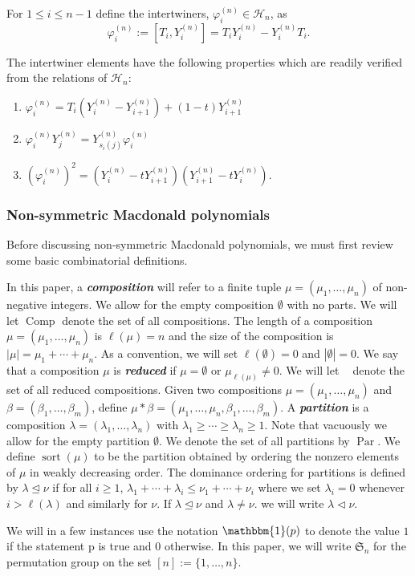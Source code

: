 \documentclass[ALCO,Unicode]{cedram}
\DeclareMathOperator{\sort}{sort}
\DeclareMathOperator{\Par}{\mathrm{Par}}
\DeclareMathOperator{\Comp}{\mathrm{Comp}}
\DeclareMathOperator{\Compred}{\mathrm{Comp}^{\textit{red}}}
\begin{document}
\begin{defi}
    For $1\leq i \leq n-1$ define the intertwiners, $\varphi_i^{(n)} \in \mathscr{H}_n$, as 
    $$\varphi_i^{(n)}:= [T_i,Y_i^{(n)}] = T_iY_i^{(n)} - Y_i^{(n)}T_i.$$
\end{defi}

The intertwiner elements have the following properties which are readily verified from the relations of $\mathscr{H}_{n}$: 
\begin{enumerate}
    \item $\varphi_i^{(n)} = T_i(Y_i^{(n)}-Y_{i+1}^{(n)}) + (1-t)Y_{i+1}^{(n)}$
    \item $\varphi_i^{(n)}Y_j^{(n)} = Y_{s_{i}(j)}^{(n)}\varphi_i^{(n)}$
    \item $(\varphi_i^{(n)})^2 = (Y_i^{(n)}-tY_{i+1}^{(n)})(Y_{i+1}^{(n)}-tY_i^{(n)}).$
\end{enumerate}


\subsubsection{Non-symmetric Macdonald polynomials}
Before discussing non-symmetric Macdonald polynomials, we must first review some basic combinatorial definitions.

\begin{defi}
 In this paper, a \textbf{\textit{composition}} will refer to a finite tuple $\mu = (\mu_1,\ldots,\mu_n)$ of non-negative integers. We allow for the empty composition $\emptyset$ with no parts. We will let $\Comp$ denote the set of all compositions. The length of a composition $\mu = (\mu_1,\ldots,\mu_n)$ is $\ell(\mu) = n$ and the size of the composition is $| \mu | = \mu_1+\cdots+\mu_n$. As a convention, we will set $\ell(\emptyset) = 0$ and $|\emptyset| = 0.$ We say that a composition $\mu$ is \textbf{\textit{reduced}} if $\mu = \emptyset$ or $\mu_{\ell(\mu)} \neq 0.$ We will let $\Compred$ denote the set of all reduced compositions. Given two compositions $\mu = (\mu_1,\ldots,\mu_n)$ and $\beta = (\beta_1,\ldots,\beta_m)$, define $\mu * \beta = (\mu_1,\ldots,\mu_n,\beta_1,\ldots,\beta_m)$. A \textbf{\textit{partition}} is a composition $\lambda = (\lambda_1,\ldots,\lambda_n)$ with $\lambda_1\geq \cdots \geq \lambda_n \geq 1$. Note that vacuously we allow for the empty partition $\emptyset.$ We denote the set of all partitions by $\Par$. We define $\sort(\mu)$ to be the partition obtained by ordering the nonzero elements of $\mu$ in weakly decreasing order. The dominance ordering for partitions is defined by $\lambda \trianglelefteq \nu$ if for all $i\geq 1$, $\lambda_1 + \cdots +\lambda_i \leq \nu_1 + \cdots +\nu_i$ where we set $\lambda_i = 0$ whenever $i > \ell(\lambda)$ and similarly for $\nu$. If $\lambda \trianglelefteq \nu$ and $\lambda \neq \nu.$ we will write $\lambda \triangleleft \nu$.
 
 We will in a few instances use the notation $\mathbbm{1}(p)$ to denote the value $1$ if the statement p is true and $0$ otherwise. In this paper, we will write $\mathfrak{S}_n$ for the permutation group on the set $[n]:= \{1,\ldots,n\}.$
 \end{defi}
\end{document}
